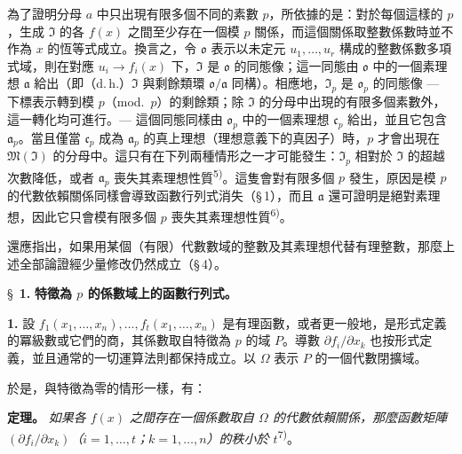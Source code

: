 \documentclass[11pt]{article}
\begin{document}
為了證明分母 $a$ 中只出現有限多個不同的素數 $p$，所依據的是：對於每個這樣的 $p$，生成 $\mathfrak{I}$ 的各 $f(x)$ 之間至少存在一個模 $p$ 關係，而這個關係取整數係數時並不作為 $x$ 的恆等式成立。換言之，令 $\mathfrak{o}$ 表示以未定元 $u_1,\ldots,u_r$ 構成的整數係數多項式域，則在對應 $u_i \to f_i(x)$ 下，$\mathfrak{I}$ 是 $\mathfrak{o}$ 的同態像；這一同態由 $\mathfrak{o}$ 中的一個素理想 $\mathfrak{a}$ 給出（即（d.\,h.）$\mathfrak{I}$ 與剩餘類環 $\mathfrak{o}/\mathfrak{a}$ 同構）。相應地，$\mathfrak{I}_p$ 是 $\mathfrak{o}_p$ 的同態像 --- 下標表示轉到模 $p$（mod.\ $p$）的剩餘類；除 $\mathfrak{I}$ 的分母中出現的有限多個素數外，這一轉化均可進行。--- 這個同態同樣由 $\mathfrak{o}_p$ 中的一個素理想 $\mathfrak{c}_p$ 給出，並且它包含 $\mathfrak{a}_p$。當且僅當 $\mathfrak{c}_p$ 成為 $\mathfrak{a}_p$ 的真上理想（理想意義下的真因子）時，$p$ 才會出現在 $\mathfrak{M}(\mathfrak{I})$ 的分母中。這只有在下列兩種情形之一才可能發生：$\mathfrak{I}_p$ 相對於 $\mathfrak{I}$ 的超越次數降低，或者 $\mathfrak{a}_p$ 喪失其素理想性質\textsuperscript{5)}。這隻會對有限多個 $p$ 發生，原因是模 $p$ 的代數依賴關係同樣會導致函數行列式消失（\S\,1），而且 $\mathfrak{a}$ 還可證明是絕對素理想，因此它只會模有限多個 $p$ 喪失其素理想性質\textsuperscript{6)}。

還應指出，如果用某個（有限）代數數域的整數及其素理想代替有理整數，那麼上述全部論證經少量修改仍然成立（\S\,4）。

\bigskip
\S~\textbf{1.}
\textbf{特徵為 $p$ 的係數域上的函數行列式。}

\smallskip

\noindent\textbf{1.}
設 $f_1(x_1,\ldots,x_n),\ldots,f_t(x_1,\ldots,x_n)$ 是有理函數，或者更一般地，是形式定義的冪級數或它們的商，其係數取自特徵為 $p$ 的域 $P$。導數 $\partial f_i/\partial x_k$ 也按形式定義，並且通常的一切運算法則都保持成立。以 $\Omega$ 表示 $P$ 的一個代數閉擴域。

於是，與特徵為零的情形一樣，有：

\noindent\textbf{定理。}
\textit{如果各 $f(x)$ 之間存在一個係數取自 $\Omega$ 的代數依賴關係，那麼函數矩陣 $(\partial f_i/\partial x_k)$（$i=1,\ldots,t$；$k=1,\ldots,n$）的秩小於 $t$}\textsuperscript{7)}。
\end{document}
